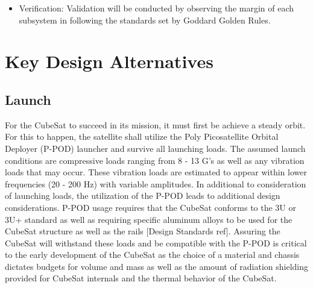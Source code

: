 \begin{enumerate}
\begin{enumerate}
\begin{enumerate}
\begin{itemize}
                            \item Verification: Validation will be conducted by observing the margin of each subsystem in following the standards set by Goddard Golden Rules.   \end{itemize}
                \end{enumerate}
        \end{enumerate}
\end{enumerate}

\section{Key Design Alternatives}
\subsection{Launch}
For the CubeSat to succeed in its mission, it must first be achieve a steady orbit. For this to happen, the satellite shall utilize the Poly Picosatellite Orbital Deployer (P-POD) launcher and survive all launching loads. The assumed launch conditions are compressive loads ranging from 8 - 13 G's as well as any vibration loads that may occur. These vibration loads are estimated to appear within lower frequencies (20 - 200 Hz) with variable amplitudes. In additional to consideration of launching loads, the utilization of the P-POD leads to additional design considerations. P-POD usage requires that the CubeSat conforms to the 3U or 3U+ standard as well as requiring specific aluminum alloys to be used for the 
CubeSat structure as well as the rails [Design Standards ref]. Assuring the CubeSat will withstand these loads and be compatible with the P-POD is critical to the early development of the CubeSat as the choice of a material and chassis dictates budgets for volume and mass as well as the amount of radiation shielding provided for CubeSat internals and the thermal behavior of the CubeSat.
